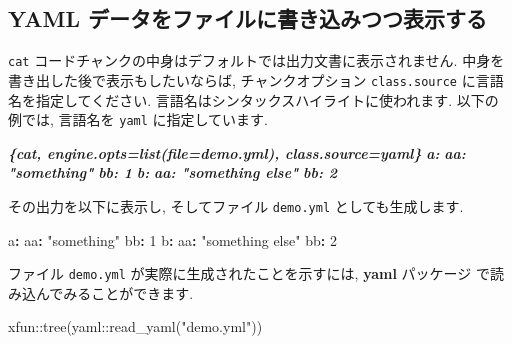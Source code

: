 \documentclass[
  11pt,
]{bxjsreport}
\newenvironment{Shaded}{\begin{snugshade}}{\end{snugshade}}
\newcommand{\AttributeTok}[1]{\textcolor[rgb]{0.77,0.63,0.00}{#1}}
\newcommand{\DecValTok}[1]{\textcolor[rgb]{0.00,0.00,0.81}{#1}}
\newcommand{\FunctionTok}[1]{\textcolor[rgb]{0.00,0.00,0.00}{#1}}
\newcommand{\InformationTok}[1]{\textcolor[rgb]{0.56,0.35,0.01}{\textbf{\textit{#1}}}}
\newcommand{\KeywordTok}[1]{\textcolor[rgb]{0.13,0.29,0.53}{\textbf{#1}}}
\newcommand{\NormalTok}[1]{#1}
\newcommand{\SpecialCharTok}[1]{\textcolor[rgb]{0.00,0.00,0.00}{#1}}
\newcommand{\StringTok}[1]{\textcolor[rgb]{0.31,0.60,0.02}{#1}}
\begin{document}
\hypertarget{yaml-ux30c7ux30fcux30bfux3092ux30d5ux30a1ux30a4ux30ebux306bux66f8ux304dux8fbcux307fux3064ux3064ux8868ux793aux3059ux308b}{%
\subsection{YAML データをファイルに書き込みつつ表示する}\label{yaml-ux30c7ux30fcux30bfux3092ux30d5ux30a1ux30a4ux30ebux306bux66f8ux304dux8fbcux307fux3064ux3064ux8868ux793aux3059ux308b}}

\texttt{cat} コードチャンクの中身はデフォルトでは出力文書に表示されません. 中身を書き出した後で表示もしたいならば, チャンクオプション \texttt{class.source} に言語名を指定してください. 言語名はシンタックスハイライトに使われます. 以下の例では, 言語名を \texttt{yaml} に指定しています.

\begin{Shaded}
\begin{Highlighting}[]
\InformationTok{\textasciigrave{}\textasciigrave{}\textasciigrave{}\{cat, engine.opts=list(file=\textquotesingle{}demo.yml\textquotesingle{}), class.source=\textquotesingle{}yaml\textquotesingle{}\}}
\InformationTok{a:}
\InformationTok{  aa: "something"}
\InformationTok{  bb: 1}
\InformationTok{b:}
\InformationTok{  aa: "something else"}
\InformationTok{  bb: 2}
\InformationTok{\textasciigrave{}\textasciigrave{}\textasciigrave{}}
\end{Highlighting}
\end{Shaded}

その出力を以下に表示し, そしてファイル \texttt{demo.yml} としても生成します.

\begin{Shaded}
\begin{Highlighting}[numbers=left,,]
\FunctionTok{a}\KeywordTok{:}
\AttributeTok{  }\FunctionTok{aa}\KeywordTok{:}\AttributeTok{ }\StringTok{"something"}
\AttributeTok{  }\FunctionTok{bb}\KeywordTok{:}\AttributeTok{ }\DecValTok{1}
\FunctionTok{b}\KeywordTok{:}
\AttributeTok{  }\FunctionTok{aa}\KeywordTok{:}\AttributeTok{ }\StringTok{"something else"}
\AttributeTok{  }\FunctionTok{bb}\KeywordTok{:}\AttributeTok{ }\DecValTok{2}
\end{Highlighting}
\end{Shaded}

ファイル \texttt{demo.yml} が実際に生成されたことを示すには, \textbf{yaml} パッケージ \autocite{R-yaml} で読み込んでみることができます.

\begin{Shaded}
\begin{Highlighting}[numbers=left,,]
\NormalTok{xfun}\SpecialCharTok{::}\FunctionTok{tree}\NormalTok{(yaml}\SpecialCharTok{::}\FunctionTok{read\_yaml}\NormalTok{(}\StringTok{"demo.yml"}\NormalTok{))}
\end{Highlighting}
\end{Shaded}
\end{document}
